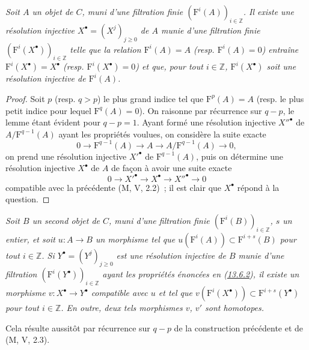\begin{lemma}[13.6.2]
\label{0.13.6.2-fr}
\emph{Soit $A$ un objet de $C$, muni d'une filtration finie
$(\mathrm F^i(A))_{i\in\mathbb Z}$. Il existe une résolution injective
$X^\bullet=(X^j)_{j\geq0}$ de $A$ munie d'une filtration finie
$(\mathrm F^i(X^\bullet))_{i\in\mathbb Z}$ telle que la relation
$\mathrm F^i(A)=A$ (resp. $\mathrm F^i(A)=0$) entraîne
$\mathrm F^i(X^\bullet)=X^\bullet$ (resp. $\mathrm F^i(X^\bullet)=0$) et
que, pour tout $i\in\mathbb Z$, $\mathrm F^i(X^\bullet)$ soit une
résolution injective de $\mathrm F^i(A)$.}
\end{lemma}
\begin{proof}
Soit $p$ (resp. $q>p$) le plus grand indice tel que
$\mathrm F^p(A)=A$ (resp. le plus petit indice pour lequel
$\mathrm F^q(A)=0$). On raisonne par récurrence sur $q-p$, le lemme étant
évident pour $q-p=1$. Ayant formé une résolution injective
${X''}^\bullet$ de $A/\mathrm F^{q-1}(A)$ ayant les propriétés voulues,
on considère la suite exacte
\[
0\to\mathrm F^{q-1}(A)\to A\to A/\mathrm F^{q-1}(A)\to0,
\]
on prend une résolution injective ${X'}^\bullet$ de
$\mathrm F^{q-1}(A)$, puis on détermine une résolution injective
$X^\bullet$ de $A$ de façon à avoir une suite exacte
\[
0\to {X'}^\bullet\to X^\bullet\to {X''}^\bullet\to0
\]
compatible avec la précédente (M, V, 2.2)~; il est clair que
$X^\bullet$ répond à la question.
\end{proof}

\begin{corollary}[13.6.3]
\label{0.13.6.3-fr}
\emph{Soit $B$ un second objet de $C$, muni d'une filtration finie
$(\mathrm F^i(B))_{i\in\mathbb Z}$, $s$ un entier, et soit $u:A\to B$
un morphisme tel que $u(\mathrm F^i(A))\subset\mathrm F^{i+s}(B)$ pour
tout $i\in\mathbb Z$. Si $Y^\bullet=(Y^j)_{j\geq0}$ est une résolution
injective de $B$ munie d'une filtration
$(\mathrm F^i(Y^\bullet))_{i\in\mathbb Z}$ ayant les propriétés énoncées
en (\hyperref[0.13.6.2-fr]{13.6.2}), il existe un morphisme
$v:X^\bullet\to Y^\bullet$ compatible avec $u$ et tel que
$v(\mathrm F^i(X^\bullet))\subset\mathrm F^{i+s}(Y^\bullet)$ pour tout
$i\in\mathbb Z$. En outre, deux tels morphismes $v$, $v'$ sont
homotopes.}
\end{corollary}

Cela résulte aussitôt par récurrence sur $q-p$ de la construction
précédente et de (M, V, 2.3).

